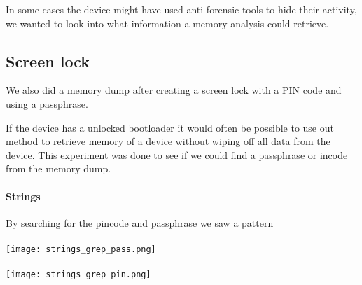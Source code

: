   In some cases the device might have used anti-forensic tools to hide their 
  activity, we wanted to look into what information a memory analysis could 
  retrieve.
  \subsection{Screen lock}
  We also did a memory dump after creating a screen lock with a PIN code and using a passphrase.
  
  If the device has a unlocked bootloader it would often be possible to use out 
  method to retrieve memory of a device without wiping off all data from the 
  device. This experiment was done to see if we could find a passphrase or 
  incode from the memory dump.

  \paragraph{Strings}
  By searching for the pincode and passphrase we saw a pattern 
  \\
  \\
  \texttt{[image: strings\_grep\_pass.png]}\\
  \\
  \texttt{[image: strings\_grep\_pin.png]}
